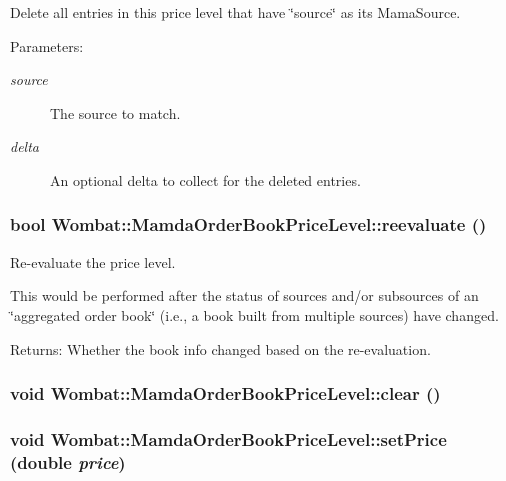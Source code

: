 Delete all entries in this price level that have \char`\"{}source\char`\"{} as its Mama\-Source. 

\begin{Desc}
\item[Parameters:]
\begin{description}
\item[{\em source}]The source to match. \item[{\em delta}]An optional delta to collect for the deleted entries. \end{description}
\end{Desc}
\hypertarget{classWombat_1_1MamdaOrderBookPriceLevel_ef4b9ff3c9200478cfef4f5b885a46c6}{
\subsubsection[reevaluate]{\setlength{\rightskip}{0pt plus 5cm}bool Wombat::Mamda\-Order\-Book\-Price\-Level::reevaluate ()}}
\label{classWombat_1_1MamdaOrderBookPriceLevel_ef4b9ff3c9200478cfef4f5b885a46c6}


Re-evaluate the price level. 

This would be performed after the status of sources and/or subsources of an \char`\"{}aggregated order book\char`\"{} (i.e., a book built from multiple sources) have changed.

\begin{Desc}
\item[Returns:]Whether the book info changed based on the re-evaluation. \end{Desc}
\hypertarget{classWombat_1_1MamdaOrderBookPriceLevel_b56d54df153563ad9fd07e9508d6e47c}{
\subsubsection[clear]{\setlength{\rightskip}{0pt plus 5cm}void Wombat::Mamda\-Order\-Book\-Price\-Level::clear ()}}
\label{classWombat_1_1MamdaOrderBookPriceLevel_b56d54df153563ad9fd07e9508d6e47c}


\hypertarget{classWombat_1_1MamdaOrderBookPriceLevel_6ee9b47163ac334bb9cd31fbd155eb6a}{
\subsubsection[setPrice]{\setlength{\rightskip}{0pt plus 5cm}void Wombat::Mamda\-Order\-Book\-Price\-Level::set\-Price (double {\em price})}}
\label{classWombat_1_1MamdaOrderBookPriceLevel_6ee9b47163ac334bb9cd31fbd155eb6a}


